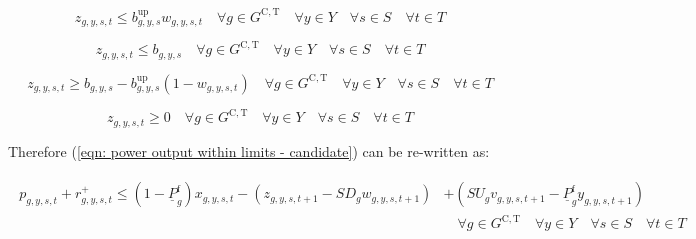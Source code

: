 \documentclass{article}
\newcommand{\sGeneratorsCandidateThermal}{G^{\mathrm{C,T}}}
\newcommand{\sYears}{Y}
\newcommand{\sScenarios}{S}
\newcommand{\sIntervals}{T}
\newcommand{\iGenerator}{g}
\newcommand{\iYear}{y}
\newcommand{\iScenario}{s}
\newcommand{\iInterval}{t}
\newcommand{\cPowerOutputMin}[1][\iGenerator]{\underline{P}_{#1}}
\newcommand{\cPowerOutputMinProportion}{\cPowerOutputMin^{\mathrm{f}}}
\newcommand{\cRampRateStartup}[1][\iGenerator]{SU_{#1}}
\newcommand{\cRampRateShutdown}[1][\iGenerator]{SD_{#1}}
\newcommand{\vStartupIndicator}[1][\iGenerator,\iYear,\iScenario,\iInterval]{v_{#1}}
\newcommand{\vShutdownIndicator}[1][\iGenerator,\iYear,\iScenario,\iInterval]{w_{#1}}
\newcommand{\vReserveUp}[1][\iGenerator,\iYear,\iScenario,\iInterval]{r^{+}_{#1}}
\newcommand{\vPower}[1][\iGenerator,\iYear,\iScenario,\iInterval]{p_{#1}}
\newcommand{\vInstalledCapacityTotalScenario}[1][\iGenerator,\iYear,\iScenario]{b_{#1}}
\newcommand{\vInstalledCapacityOnStateAux}[1][\iGenerator,\iYear,\iScenario,\iInterval]{x_{#1}}
\newcommand{\vInstalledCapacityStartupStateAux}[1][\iGenerator,\iYear,\iScenario,\iInterval]{y_{#1}}
\newcommand{\vInstalledCapacityShutdownStateAux}[1][\iGenerator,\iYear,\iScenario,\iInterval]{z_{#1}}
\begin{document}
\begin{equation}
\vInstalledCapacityShutdownStateAux \leq \vInstalledCapacityTotalScenario^{\mathrm{up}} \vShutdownIndicator \quad \forall \iGenerator \in \sGeneratorsCandidateThermal \quad \forall \iYear \in \sYears \quad \forall \iScenario \in \sScenarios \quad \forall \iInterval \in \sIntervals
\label{eqn: shutdown state aux variable block start}
\end{equation}

\begin{equation}
\vInstalledCapacityShutdownStateAux \leq \vInstalledCapacityTotalScenario \quad \forall \iGenerator \in \sGeneratorsCandidateThermal \quad \forall \iYear \in \sYears \quad \forall \iScenario \in \sScenarios \quad \forall \iInterval \in \sIntervals
\end{equation}

\begin{equation}
\vInstalledCapacityShutdownStateAux \geq \vInstalledCapacityTotalScenario - \vInstalledCapacityTotalScenario^{\mathrm{up}} \left(1 - \vShutdownIndicator \right) \quad \forall \iGenerator \in \sGeneratorsCandidateThermal \quad \forall \iYear \in \sYears \quad \forall \iScenario \in \sScenarios \quad \forall \iInterval \in \sIntervals
\end{equation}

\begin{equation}
\vInstalledCapacityShutdownStateAux \geq 0 \quad \forall \iGenerator \in \sGeneratorsCandidateThermal \quad \forall \iYear \in \sYears \quad \forall \iScenario \in \sScenarios \quad \forall \iInterval \in \sIntervals
\label{eqn: shutdown state aux variable block end}
\end{equation}

Therefore (\ref{eqn: power output within limits - candidate}) can be re-written as:

\begin{align}
	\begin{split}
		\vPower + \vReserveUp \leq \left(1 - \cPowerOutputMinProportion\right) \vInstalledCapacityOnStateAux - \left(\vInstalledCapacityShutdownStateAux[\iGenerator,\iYear,\iScenario,\iInterval+1] -\cRampRateShutdown \vShutdownIndicator[\iGenerator,\iYear,\iScenario,\iInterval+1] \right) & + \left(\cRampRateStartup \vStartupIndicator[\iGenerator,\iYear,\iScenario,\iInterval+1] - \cPowerOutputMinProportion \vInstalledCapacityStartupStateAux[\iGenerator,\iYear,\iScenario,\iInterval+1] \right)\\
		& \quad \forall \iGenerator \in \sGeneratorsCandidateThermal \quad \forall \iYear \in \sYears \quad \forall \iScenario \in \sScenarios \quad \forall \iInterval \in \sIntervals\\
	\end{split}
\end{align}
\end{document}
